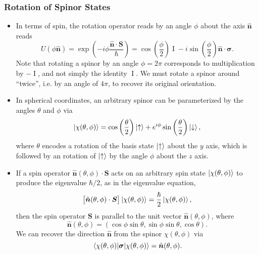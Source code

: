 \documentclass[11pt, a4paper]{article}
\renewcommand{\vec}[1]{\bm{#1}}  %
\newcommand{\uvec}[1]{\hat{\vec{#1}}}  %
\newcommand{\ua}{\uparrow}  %
\newcommand{\da}{\downarrow}  %
\renewcommand{\S}{\vec{S}}  %
\newcommand{\II}{\operatorname{I}}  %
\begin{document}
\subsubsection{Rotation of Spinor States}
\begin{itemize}

	\item In terms of spin, the rotation operator reads by an angle $ \phi $ about the axis $ \uvec{n} $ reads
    \begin{equation*}
        U(\phi \uvec{n}) = \exp \left( - i \phi \frac{\uvec{n}\cdot \S}{\hbar} \right) = \cos \left(\frac{\phi}{2}\right)\II - i \sin \left(\frac{\phi}{2}\right)\uvec{n} \cdot \vec{\sigma}.
	\end{equation*}
	Note that rotating a spinor by an angle $ \phi = 2\pi $ corresponds to multiplication by $ -\II $, and not simply the identity $ \II $. We must rotate a spinor around ``twice'', i.e. by an angle of $ 4\pi $, to recover its original orientation.
	

    \item In spherical coordinates, an arbitrary spinor can be parameterized by the angles $ \theta $ and $ \phi $ via
    \begin{equation*}
		\ket{\chi(\theta, \phi)} = \cos \left(\frac{\theta}{2}\right)\ket{\ua} + e^{i \phi} \sin \left(\frac{\theta}{2}\right)\ket{\da},
    \end{equation*}
    where $ \theta $ encodes a rotation of the basis state $ \ket{\ua} $ about the $ y $ axis, which is followed by an rotation of $ \ket{\ua} $ by the angle $ \phi $ about the $ z $ axis.
    
    

    \item If a spin operator $ \uvec{n}(\theta, \phi) \cdot \S $ acts on an arbitrary spin state $ \ket{\chi(\theta, \phi)} $ to produce the eigenvalue $ \hbar/2 $, as in the eigenvalue equation,
	\begin{equation*}
        \big[ \uvec{n}(\theta, \phi) \cdot \S \big] \ket{\chi(\theta, \phi)} = \frac{\hbar}{2} \ket{\chi(\theta, \phi)},
	\end{equation*}
    then the spin operator $ \S $ is parallel to the unit vector $ \uvec{n}(\theta, \phi) $, where
    \begin{equation*}
        \uvec{n}(\theta, \phi) = (\cos \phi \sin \theta, \sin \phi \sin \theta, \cos \theta).
    \end{equation*}
    We can recover the direction $ \uvec{n} $ from the spinor $ \chi(\theta, \phi) $ via
	\begin{equation*}
		\mel{\chi(\theta, \phi)}{\vec{\sigma}}{\chi(\theta, \phi)} = \uvec{n}(\theta, \phi).
	\end{equation*}

\end{itemize}
\end{document}
